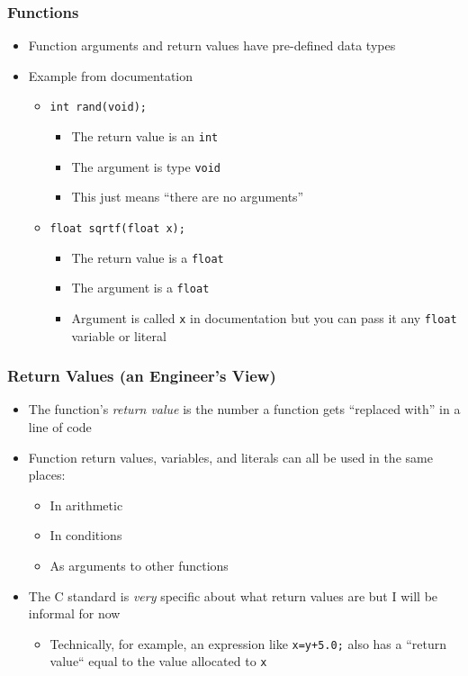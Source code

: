 \documentclass[14pt]{beamer}
\begin{document}
\begin{frame}
\frametitle{Functions}
\begin{itemize}
\item Function arguments and return values have pre-defined data types
\pause
\item Example from documentation
\begin{itemize}
\item \texttt{int~rand(void);}
	\begin{itemize}
		\item The return value is an \texttt{int}
		\item The argument is type \texttt{void}
		\item This just means ``there are no arguments''
	\end{itemize}
\pause
\item \texttt{float sqrtf(float x);}
	\begin{itemize}
		\item The return value is a \texttt{float}
		\item The argument is a \texttt{float}
		\item Argument is called \texttt{x} in documentation but you can pass it any \texttt{float} variable or literal
	\end{itemize}
\end{itemize}
\end{itemize}
\end{frame}

\begin{frame}
\frametitle{Return Values (an Engineer's View)}
\begin{itemize}
\item The function's \textit{return value} is the number a function gets ``replaced with'' in a line of code
\pause
\item Function return values, variables, and literals can all be used in the same places:
	\begin{itemize}
		\item In arithmetic
		\item In conditions
		\item As arguments to other functions
	\end{itemize}	 
\pause
\item The C standard is \textit{very} specific about what return values are but I will be informal for now
	\begin{itemize}
		\item Technically, for example, an expression like \texttt{x=y+5.0;} also has a ``return value`` equal to the value allocated to \texttt{x}
	\end{itemize}
\end{itemize}
\end{frame}
\end{document}
